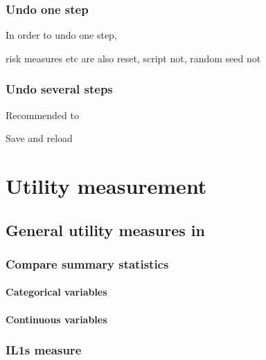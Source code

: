 \documentclass[letterpaper,10pt,english]{sphinxmanual}
\begin{document}
\subsection{Undo one step}
\label{\detokenize{anon:undo-one-step}}
In order to undo one step,

risk measures etc are also reset, script not, random seed not


\subsection{Undo several steps}
\label{\detokenize{anon:undo-several-steps}}
Recommended to

Save and reload


\chapter{Utility measurement}
\label{\detokenize{utility::doc}}\label{\detokenize{utility:utility-measurement}}

\section{General utility measures in }
\label{\detokenize{utility:general-utility-measures-in-sdcapp}}

\subsection{Compare summary statistics}
\label{\detokenize{utility:compare-summary-statistics}}

\subsubsection{Categorical variables}
\label{\detokenize{utility:categorical-variables}}

\subsubsection{Continuous variables}
\label{\detokenize{utility:continuous-variables}}

\subsection{IL1s measure}
\label{\detokenize{utility:il1s-measure}}
\end{document}
